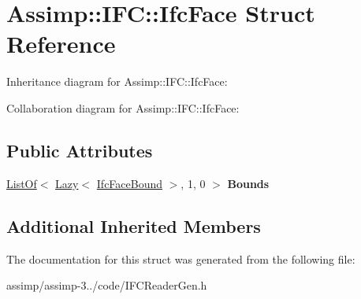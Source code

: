 \hypertarget{struct_assimp_1_1_i_f_c_1_1_ifc_face}{\section{Assimp\+:\+:I\+F\+C\+:\+:Ifc\+Face Struct Reference}
\label{struct_assimp_1_1_i_f_c_1_1_ifc_face}
}


Inheritance diagram for Assimp\+:\+:I\+F\+C\+:\+:Ifc\+Face\+:


Collaboration diagram for Assimp\+:\+:I\+F\+C\+:\+:Ifc\+Face\+:
\subsection*{Public Attributes}
\begin{DoxyCompactItemize}
\item 
\hypertarget{struct_assimp_1_1_i_f_c_1_1_ifc_face_a668f9f848097bb512607be727eff19af}{\hyperlink{struct_assimp_1_1_s_t_e_p_1_1_list_of}{List\+Of}$<$ \hyperlink{struct_assimp_1_1_s_t_e_p_1_1_lazy}{Lazy}$<$ \hyperlink{struct_assimp_1_1_i_f_c_1_1_ifc_face_bound}{Ifc\+Face\+Bound} $>$, 1, 0 $>$ {\bfseries Bounds}}\label{struct_assimp_1_1_i_f_c_1_1_ifc_face_a668f9f848097bb512607be727eff19af}

\end{DoxyCompactItemize}
\subsection*{Additional Inherited Members}


The documentation for this struct was generated from the following file\+:\begin{DoxyCompactItemize}
\item 
assimp/assimp-\/3../code/I\+F\+C\+Reader\+Gen.\+h\end{DoxyCompactItemize}
